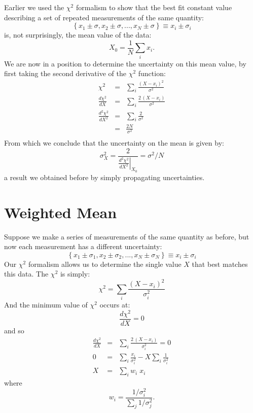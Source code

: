 \documentclass[12pt,oneside]{book}
\begin{document}
Earlier we used the $\chi^2$ formalism to show that the best fit constant value describing a set of repeated measurements of the same quantity:
\begin{displaymath}
\left\{ x_1 \pm \sigma, x_2 \pm \sigma, ..., x_N \pm \sigma \right\} \equiv x_i \pm \sigma_i
\end{displaymath}
is, not surprisingly, the mean value of the data:
\begin{displaymath}
X_0 = \frac{1}{N} \sum_i x_i \label{eqn:mean}.
\end{displaymath}
We are now in a position to determine the uncertainty on this mean value, by first taking the second derivative of the $\chi^2$ function:
\begin{eqnarray*}
\chi^2 &=& \sum_i \frac{(X-x_i)^2}{\sigma^2} \\
\frac{d\chi^2}{dX} &=& \sum_i \frac{2\,(X-x_i)}{\sigma^2}\\
\frac{d^2\chi^2}{dX^2} &=& \sum_i \frac{2}{\sigma^2}\\
&=& \frac{2 N}{\sigma^2}\\
\end{eqnarray*}
From which we conclude that the uncertainty on the mean is given by:
\begin{displaymath}
\sigma^2_X = \frac{2}{\left. \frac{d^2\chi^2}{dX^2} \right|_{X_0}} = \sigma^2 / N
\end{displaymath}
a result we obtained before by simply propagating uncertainties.

\section{Weighted Mean}

Suppose we make a series of measurements of the same quantity as before, but now each measurement has a different uncertainty:
\begin{displaymath}
\left\{ x_1 \pm \sigma_1, x_2 \pm \sigma_2, ..., x_N \pm \sigma_N \right\} \equiv x_i \pm \sigma_i
\end{displaymath}
Our $\chi^2$ formalism allows us to determine the single value $X$ that best matches this data.  The $\chi^2$ is simply:
\begin{displaymath}
\chi^2 = \sum_i \frac{(X-x_i)^2}{\sigma_i^2}
\end{displaymath}
And the minimum value of $\chi^2$ occurs at:
\begin{displaymath}
\frac{d\chi^2}{dX} = 0
\end{displaymath}
and so
\begin{eqnarray*}
\frac{d\chi^2}{dX} &=& \sum_i \frac{2\,(X - x_i)}{\sigma_i^2} = 0\\
0 &=& \sum_i \frac{x_i}{\sigma^2_i} - X \sum_i \frac{1}{\sigma^2_i}\\
X &=& \sum_i w_i \; x_i
\end{eqnarray*}
where
\begin{equation}
w_i = \frac{1/\sigma^2_i}{\sum_j 1/\sigma_j^2}.
\end{equation}
\end{document}
